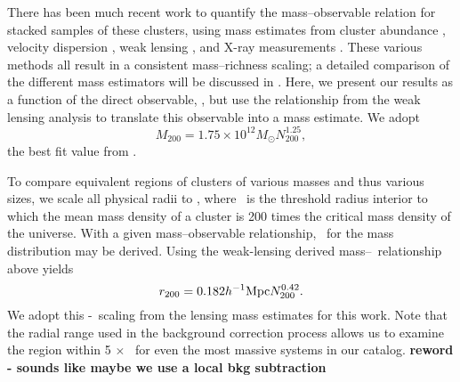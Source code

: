 \documentclass{emulateapj}
\begin{document}

\begin{figure}
\end{figure}

There has been much recent work to quantify the mass--observable
relation for stacked samples of these clusters, using mass estimates
from cluster abundance \citep{Rozo07b}, velocity dispersion
\citep{Becker07}, weak lensing \citep{Sheldon07a, Johnston07b}, and
X-ray measurements \citep{Rykoff07}. These various methods all result
in a consistent mass--richness scaling; a detailed comparison of the
different mass estimators will be discussed in \citet{Rozo08}. Here,
we present our results as a function of the direct observable, \Ntwo,
but use the relationship from the weak lensing analysis to translate this
observable into a mass estimate. We adopt
\begin{equation}
M_{200} = 1.75 \times 10^{12} M_{\odot} N_{200}^{1.25}, 
\end{equation}
the best fit value from \citet{Johnston07b}.



To compare equivalent regions of clusters of various masses and thus
various sizes, we scale all physical radii to \rtwo, where \rtwo\ is
the threshold radius interior to which the mean mass density of a
cluster is 200 times the critical mass density of the universe. With a given
mass--observable relationship, \rtwo\ for the mass distribution may be
derived. Using the weak-lensing derived mass--\Ntwo\ relationship above yields
\begin{equation}
r_{200} = 0.182 h^{-1} {\rm Mpc} N_{200}^{0.42}.
\end{equation}
We adopt this \rtwo-\Ntwo\ scaling from the \citet{Johnston07b} lensing mass estimates for this work. Note that the radial range used in the background correction process allows us to examine the region within 5 $\times$ \rtwo\ for even the most massive systems in our catalog. {\bf reword - sounds like maybe we use a local bkg subtraction}
\end{document}
